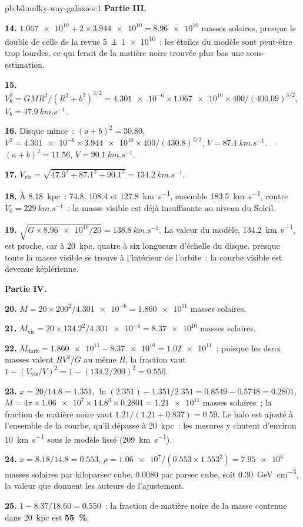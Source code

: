 \begin{solution}{pb:b3:milky-way-galaxies:1}
\textbf{Partie III.}

\textbf{14.} $\num{1.067e10} + 2\times\num{3.944e10} = \num{8.96e10}$ masses solaires,
presque le double de celle de la revue \num[separate-uncertainty=true]{5 \pm 1 e10}~; les étoiles du modèle
sont peut-être trop lourdes, ce qui ferait de la matière noire trouvée plus bas
une sous-estimation.

\textbf{15.} $V_b^2 = GMR^2/(R^2 + b^2)^{3/2} = \num{4.301e-6}\times\num{1.067e10}
\times400/(400.09)^{3/2}$, $V_b = \qty{47.9}{km.s^{-1}}$.

\textbf{16.} Disque mince~: $(a + b)^2 = 30.80$, $V^2 = \num{4.301e-6}\times\num{3.944e10}
\times400/(430.8)^{3/2}$, $V = \qty{87.1}{km.s^{-1}}$. ~:
$(a + b)^2 = 11.56$, $V = \qty{90.1}{km.s^{-1}}$.

\textbf{17.} $V_\mathrm{vis} = \sqrt{47.9^2 + 87.1^2 + 90.1^2} =
\qty{134.2}{km.s^{-1}}$.

\textbf{18.} À \qty{8.18}{kpc}~: 74.8, 108.4 et \qty{127.8}{km.s^{-1}},
ensemble \qty{183.5}{km.s^{-1}}, contre $V_0 = \qty{229}{km.s^{-1}}$~:
la masse visible est déjà insuffisante au niveau du Soleil.

\textbf{19.} $\sqrt{G\times\num{8.96e10}/20} = \qty{138.8}{km.s^{-1}}$. La
valeur du modèle, \qty{134.2}{km.s^{-1}}, est proche, car à \qty{20}{kpc},
quatre à six longueurs d'échelle du disque, presque toute la masse visible se
trouve à l'intérieur de l'orbite~: la courbe visible est devenue képlérienne.

\textbf{Partie IV.}

\textbf{20.} $M = 20\times200^2/\num{4.301e-6} = \num{1.860e11}$ masses solaires.

\textbf{21.} $M_\mathrm{vis} = 20\times134.2^2/\num{4.301e-6} = \num{8.37e10}$
masses solaires.

\textbf{22.} $M_\mathrm{dark} = \num{1.860e11} - \num{8.37e10} = \num{1.02e11}$~;
puisque les deux masses valent $RV^2/G$ au même $R$, la fraction vaut
$1 - (V_\mathrm{vis}/V)^2 = 1 - (134.2/200)^2 = \num{0.550}$.

\textbf{23.} $x = 20/14.8 = 1.351$, $\ln(2.351) - 1.351/2.351 = 0.8549 - 0.5748
= 0.2801$, $M = 4\pi\times\num{1.06e7}\times14.8^3\times0.2801 =
\num{1.21e11}$ masses solaires~; la fraction de matière noire vaut
$1.21/(1.21 + 0.837) = \num{0.59}$. Le halo est ajusté à l'ensemble
de la courbe, qu'il dépasse à \qty{20}{kpc}~: les mesures y chutent
d'environ \qty{10}{km.s^{-1}} sous le modèle lissé (\qty{209}{km.s^{-1}}).

\textbf{24.} $x = 8.18/14.8 = 0.553$, $\rho = \num{1.06e7}/(0.553\times1.553^2)
= \num{7.95e6}$ masses solaires par kiloparsec cube, \num{0.0080} par
parsec cube, soit \qty{0.30}{GeV.cm^{-3}}, la valeur que donnent les auteurs de
l'ajustement.

\textbf{25.} $1 - 8.37/18.60 = \num{0.550}$~: la fraction de matière noire de la
masse contenue dans \qty{20}{kpc} est
\textbf{\qty[text-series-to-math=true]{55}{\percent}}.
\end{solution}
